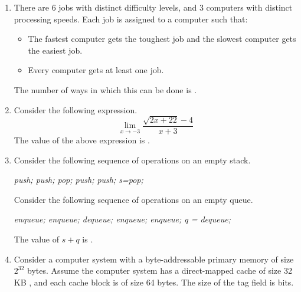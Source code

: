 \documentclass[a4paper, 11pt]{article}
\begin{document}
\begin{enumerate}
    \item There are 6 jobs with distinct difficulty levels, and 3 computers with distinct processing speeds. Each job is assigned to a computer such that:
    \begin{itemize}
        \item The fastest computer gets the toughest job and the slowest computer gets the easiest job.
        \item Every computer gets at least one job.
    \end{itemize}
    The number of ways in which this can be done is \underline{\hspace{2cm}}.
    
    \hfill{}
    
    \item Consider the following expression.
    \[ \lim_{x\rightarrow-3}\frac{\sqrt{2x+22}-4}{x+3} \]
    The value of the above expression  is \underline{\hspace{2cm}}.
    
    \hfill{}
    
    \item Consider the following sequence of operations on an empty stack.\\
    \begin{center}
    \textit{
    push; push; pop\brak{}; push; push; s=pop\brak{};
    }
    \end{center}
    Consider the following sequence of operations on an empty queue.
    \begin{center}
    \textit{
    enqueue; enqueue; dequeue\brak{}; enqueue; enqueue; q = dequeue\brak{};
    }
    \end{center}
    The value of $s+q$ is \underline{\hspace{2cm}}.
    \hfill{}
    
    \item Consider a computer system with a byte-addressable primary memory of size $2^{32}$ bytes. Assume the computer system has a direct-mapped cache of size 32 KB , and each cache block is of size 64 bytes. The size of the tag field is \underline{\hspace{2cm}} bits.
    \hfill{}
    

\end{enumerate}
\end{document}

